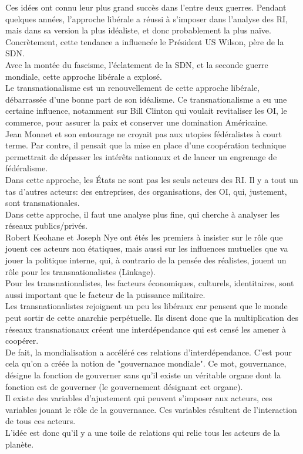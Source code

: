\documentclass[10pt, a4paper, openany]{book}
\begin{document}
Ces idées ont connu leur plus grand succès dans l'entre deux guerres. Pendant quelques années, l'approche libérale a réussi à s'imposer dans l'analyse des RI, mais dans sa version la plus idéaliste, et donc probablement la plus naïve. \\
Concrètement, cette tendance a influencée le Président US Wilson, père de la SDN. \\
Avec la montée du fascisme, l'éclatement de la SDN, et la seconde guerre mondiale, cette approche libérale a explosé.\\
Le transnationalisme est un renouvellement de cette approche libérale, débarrassée d'une bonne part de son idéalisme. Ce transnationalisme a eu une certaine influence, notamment sur Bill Clinton qui voulait revitaliser les OI, le commerce, pour assurer la paix et conserver une domination Américaine. \\
Jean Monnet et son entourage ne croyait pas aux utopies fédéralistes à court terme. Par contre, il pensait que la mise en place d'une coopération technique permettrait de dépasser les intérêts nationaux et de lancer un engrenage de fédéralisme. \\
Dans cette approche, les États ne sont pas les seuls acteurs des RI. Il y a tout un tas d'autres acteurs: des entreprises, des organisations, des OI, qui, justement, sont transnationales. \\
Dans cette approche, il faut une analyse plus fine, qui cherche à analyser les réseaux publics/privés. \\
Robert Keohane et Joseph Nye ont étés les premiers à insister sur le rôle que jouent ces acteurs non étatiques, mais aussi sur les influences mutuelles que va jouer la politique interne, qui, à contrario de la pensée des réalistes, jouent un rôle pour les transnationalistes (Linkage). \\
Pour les transnationalistes, les facteurs économiques, culturels, identitaires, sont aussi important que le facteur de la puissance militaire. \\
Les transnationalistes rejoignent un peu les libéraux car pensent que le monde peut sortir de cette anarchie perpétuelle. Ils disent donc que la multiplication des réseaux transnationaux créent une interdépendance qui est censé les amener à coopérer. \\


De fait, la mondialisation a accéléré ces relations d'interdépendance. C'est pour cela qu'on a créée la notion de "gouvernance mondiale". Ce mot, gouvernance, désigne la fonction de gouverner sans qu'il existe un véritable organe dont la fonction est de gouverner (le gouvernement désignant cet organe). \\
Il existe des variables d'ajustement qui peuvent s'imposer aux acteurs, ces variables jouant le rôle de la gouvernance. Ces variables résultent de l'interaction de tous ces acteurs. \\
L'idée est donc qu'il y a une toile de relations qui relie tous les acteurs de la planète.
\end{document}
